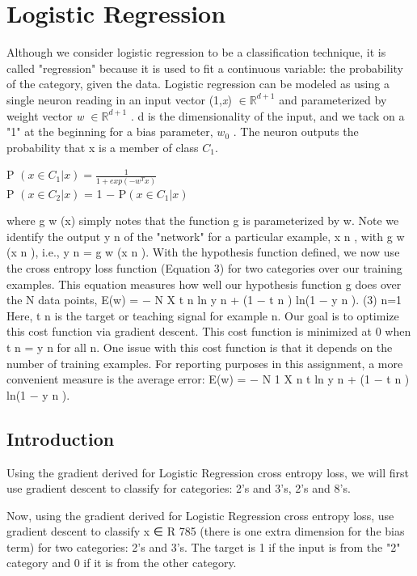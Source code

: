 \documentclass{article} %
\begin{document}
\section{Logistic Regression}
Although we consider logistic regression to be a classification technique, it is called "regression" because it is used to fit a continuous variable: the probability of the category, given the data. Logistic regression can be modeled as using a single neuron reading in an input vector (1,{\sl x}) $\in \mathbb{R}^{d+1}$ and parameterized by weight vector {\sl w} $\in \mathbb{R}^{d+1}$ . d is the dimensionality of the input, and we tack on a "1" at the beginning for a bias parameter, $w_0$ . The neuron outputs the probability that x is a member of class $C_1$.\\
\begin{center}
P $(x \in C_1 |x) = \frac{1}{1+exp(-w^T x)}$\\
P $(x \in C_2 |x)$ = 1 − P$(x \in C_1 |x)$
\end{center}
where g w (x) simply notes that the function g is parameterized by w. Note we identify the output y n of the "network"
for a particular example, x n , with g w (x n ), i.e., y n = g w (x n ). With the hypothesis function defined, we now use
the cross entropy loss function (Equation 3) for two categories over our training examples. This equation measures
how well our hypothesis function g does over the N data points,
E(w) = −
N
X
{t n ln y n + (1 − t n ) ln(1 − y n )}.
(3)
n=1
Here, t n is the target or teaching signal for example n. Our goal is to optimize this cost function via gradient
descent. This cost function is minimized at 0 when t n = y n for all n. One issue with this cost function is that it
depends on the number of training examples. For reporting purposes in this assignment, a more convenient measure
is the average error:
E(w) = −
N
1 X n
{t ln y n + (1 − t n ) ln(1 − y n )}.
\subsection{Introduction}
Using the gradient derived for Logistic Regression cross entropy loss, we will first use gradient descent to classify for categories: 2's and 3's, 2's and 8's.  

Now, using the gradient derived for Logistic Regression cross entropy loss, use gradient descent to classify x ∈ R 785 (there is one extra dimension for the bias term) for two categories: 2’s and 3’s. The target is 1 if the input is from the "2" category and 0 if it is from the other category. 
\end{document}

